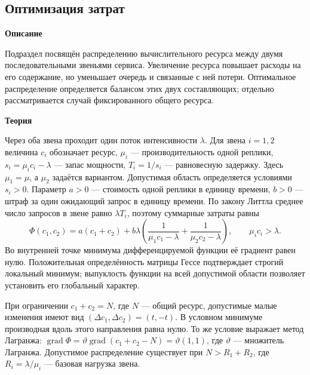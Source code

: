 \documentclass[12pt,a4paper]{article}
\newcommand{\taskhead}[1]{\par\textbf{#1}\par}
\begin{document}
\subsection{Оптимизация затрат}
\taskhead{Описание}
Подраздел посвящён распределению вычислительного ресурса между двумя
последовательными звеньями сервиса. Увеличение ресурса повышает расходы
на его содержание, но уменьшает очередь и связанные с ней потери.
Оптимальное распределение определяется балансом этих двух составляющих;
отдельно рассматривается случай фиксированного общего ресурса.
\taskhead{Теория}
Через оба звена проходит один поток интенсивности $\lambda$.
Для звена $i=1,2$ величина $c_i$ обозначает ресурс, $\mu_i$ --- производительность
одной реплики, $s_i=\mu_ic_i-\lambda$ --- запас мощности,
$T_i=1/s_i$ --- равновесную задержку. Здесь $\mu_1=\mu$,
а $\mu_2$ задаётся вариантом. Допустимая область определяется условиями $s_i>0$.
Параметр $a>0$ --- стоимость одной реплики в единицу времени,
$b>0$ --- штраф за один ожидающий запрос в единицу времени.
По закону Литтла среднее число запросов в звене равно $\lambda T_i$,
поэтому суммарные затраты равны
\begin{equation}\label{eq:cost}
\Phi(c_1,c_2)=a(c_1+c_2)+b\lambda\left(\frac1{\mu_1c_1-\lambda}
+\frac1{\mu_2c_2-\lambda}\right),\qquad \mu_i c_i>\lambda.
\end{equation}
Во внутренней точке минимума дифференцируемой функции её градиент равен нулю.
Положительная определённость матрицы Гессе подтверждает строгий локальный
минимум; выпуклость функции на всей допустимой области позволяет установить
его глобальный характер.

При ограничении $c_1+c_2=N$, где $N$ --- общий ресурс, допустимые малые
изменения имеют вид $(\Delta c_1,\Delta c_2)=(t,-t)$.
В условном минимуме производная вдоль этого направления равна нулю.
То же условие выражает метод Лагранжа:
$\operatorname{grad}\Phi=\vartheta\operatorname{grad}(c_1+c_2-N)
=\vartheta(1,1)$, где $\vartheta$ --- множитель Лагранжа.
Допустимое распределение существует при $N>R_1+R_2$,
где $R_i=\lambda/\mu_i$ --- базовая нагрузка звена.
\end{document}
